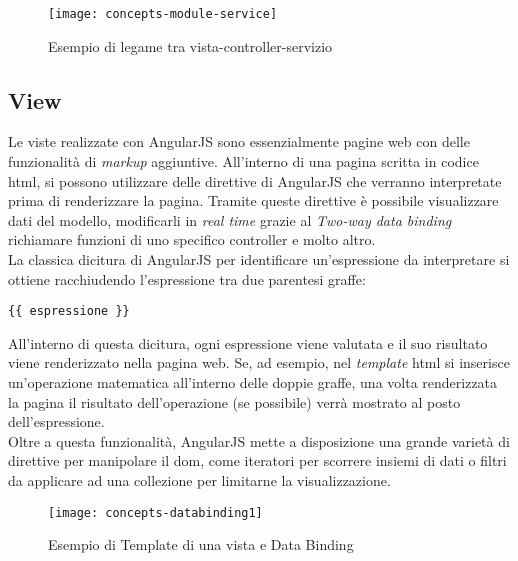 \begin{figure}[!h] 
    \centering 
    \texttt{[image: concepts-module-service]} 
    \caption{Esempio di legame tra vista-controller-servizio}
\end{figure}

\subsection{View}
Le viste realizzate con AngularJS sono essenzialmente pagine web con delle funzionalità di \emph{markup} aggiuntive. All'interno di una pagina scritta in codice \gls{html}, si possono utilizzare delle direttive di AngularJS che verranno interpretate prima di renderizzare la pagina. Tramite queste direttive è possibile visualizzare dati del modello, modificarli in \emph{real time} grazie al \emph{Two-way data binding} richiamare funzioni di uno specifico controller e molto altro.\\
La classica dicitura di AngularJS per identificare un'espressione da interpretare si ottiene racchiudendo l'espressione tra due parentesi graffe: 
\begin{verbatim}
{{ espressione }}
\end{verbatim}
All'interno di questa dicitura, ogni espressione viene valutata e il suo risultato viene renderizzato nella pagina web. Se, ad esempio, nel \emph{template} \gls{html} si inserisce un'operazione matematica all'interno delle doppie graffe, una volta renderizzata la pagina il risultato dell'operazione (se possibile) verrà mostrato al posto dell'espressione.\\
Oltre a questa funzionalità, AngularJS mette a disposizione una grande varietà di direttive per manipolare il \gls{dom}, come iteratori per scorrere insiemi di dati o filtri da applicare ad una collezione per limitarne la visualizzazione.

\begin{figure}[!h] 
    \centering 
    \texttt{[image: concepts-databinding1]} 
    \caption{Esempio di Template di una vista e Data Binding}
\end{figure}

